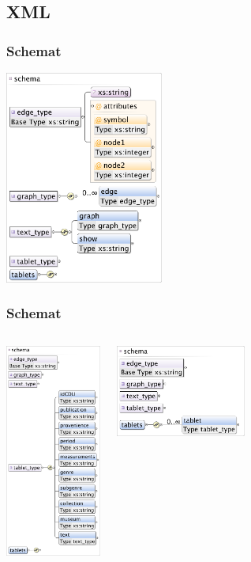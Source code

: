 

\subsection{XML}
\begin{frame}
 \frametitle{Schemat}
\begin{center}
\includegraphics[height=70mm]{../diagramy/schema_text.png}
\end{center}

\end{frame}


\begin{frame}
 \frametitle{Schemat}

\begin{columns}[t]
\column{40mm}
\begin{center}
\includegraphics[height=70mm]{../diagramy/schema_tablet.png}
\end{center}
\column{40mm}
\begin{center}
\includegraphics[height=30mm]{../diagramy/schema_tablets.png}
\end{center}
\end{columns}

\end{frame}
